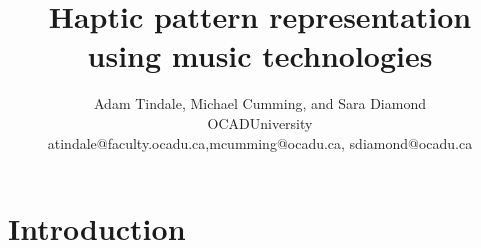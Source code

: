 \documentclass[11pt]{article}
\title{Haptic pattern representation using music technologies }
\author{Adam Tindale, Michael Cumming, and Sara Diamond\\
    OCADUniversity \\
    \small{atindale@faculty.ocadu.ca,mcumming@ocadu.ca, sdiamond@ocadu.ca}}
\begin{document}
\maketitle
\section{Introduction}
\end{document}
